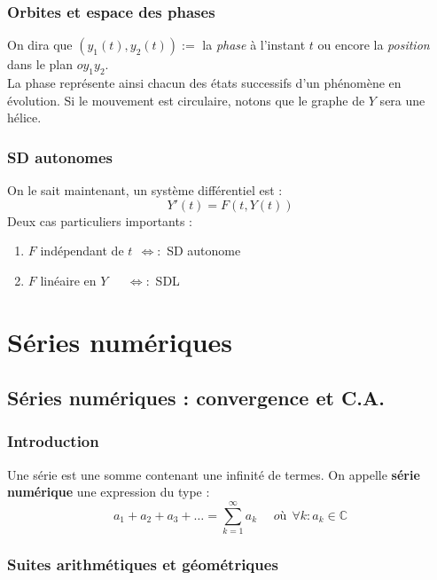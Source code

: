 \documentclass[11pt, a4paper, openany]{book}
\begin{document}
\subsection{Orbites et espace des phases}
On dira que $(y_1(t), y_2(t)) :=$ la \textit{phase} à l'instant $t$ ou encore la \textit{position} dans le plan $oy_1y_2$.\\
La phase représente ainsi chacun des états successifs d'un phénomène en évolution. Si le mouvement est circulaire, notons que le graphe de $Y$ sera une hélice.
		
\subsection{SD autonomes}
On le sait maintenant, un système différentiel est :
\begin{equation}
	Y'(t) = F(t, Y(t))
\end{equation}
Deux cas particuliers importants : 
\begin{enumerate}
	\item $F$ indépendant de $t\ \ \Leftrightarrow : $ SD autonome
	\item $F$ linéaire en $Y\ \ \ \ \ \ \ \Leftrightarrow : $ SDL
\end{enumerate}
		
		
		
		
		
		
		
		
		
		
		
		
		
\setcounter{chapter}{10}
\chapter{Séries numériques}
\section{Séries numériques : convergence et C.A.}
\subsection{Introduction}
Une série est une somme contenant une infinité de termes. On appelle \textbf{série numérique} une expression du type :
\begin{equation}
	a_1 + a_2 + a_3 + \dots = \sum_{k=1}^\infty a_k\ \ \ \ \ \ où\ \ \forall k : a_k \in \mathbb{C}
\end{equation}
		
\subsection{Suites arithmétiques et géométriques}
\end{document}
